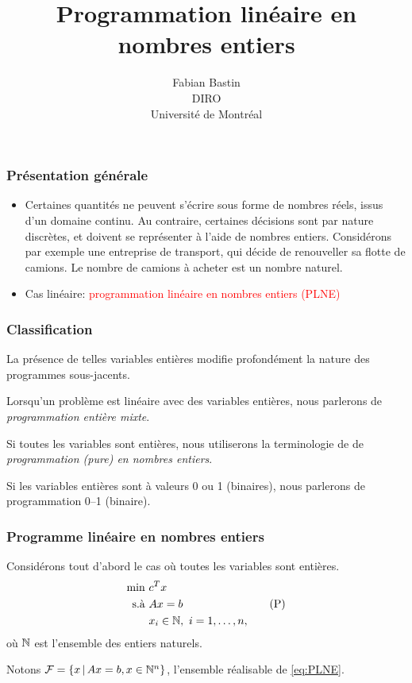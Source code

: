 \documentclass[usepdftitle=false]{beamer}
\title[PLNE]{Programmation linéaire en nombres entiers}
\author[Fabian Bastin]{Fabian Bastin\\DIRO\\Université de Montréal\\\mbox{}}
\date{}
\def\cF{\mathcal{F}}
\begin{document}
\frame{\titlepage}

\begin{frame}
\frametitle{Présentation générale}

\begin{itemize}
\item 
Certaines quantités ne peuvent s'écrire sous forme de nombres réels, issus d'un domaine continu. Au contraire, certaines décisions sont par nature discrètes, et doivent se représenter à l'aide de nombres entiers.
Considérons par exemple une entreprise de transport, qui décide de renouveller sa flotte de camions.
Le nombre de camions à acheter est un nombre naturel.
\item 
Cas linéaire: \textcolor{red}{programmation linéaire en nombres entiers (PLNE)}
\end{itemize}



\end{frame}

\begin{frame}
\frametitle{Classification}

La présence de telles variables entières modifie profondément la nature des programmes sous-jacents.

\mbox{}

Lorsqu'un problème est linéaire avec des variables entières, nous parlerons de {\sl programmation entière mixte}.

\mbox{}

Si toutes les variables sont entières, nous utiliserons la terminologie de de {\sl programmation (pure) en nombres entiers}.

\mbox{}

Si les variables entières sont à valeurs 0 ou 1 (binaires), nous parlerons de programmation 0--1 (binaire).

\end{frame}

\begin{frame}
\frametitle{Programme linéaire en nombres entiers}

Considérons tout d'abord le cas où toutes les variables sont entières.
\begin{equation}
\begin{aligned}
\min\ & c^Tx \\
\mbox{s.à } & Ax = b \\
& x_i \in {\mathbb{N}},\ i = 1,\ldots,n,
\end{aligned}
\tag{P}
\label{eq:PLNE}
\end{equation}
où ${\mathbb{N}}$ est l'ensemble des entiers naturels.

\mbox{}

Notons $\cF = \{ x \,|\, Ax = b, x \in \NN^n \}$,
l'ensemble réalisable de \eqref{eq:PLNE}.

\end{frame}
\end{document}
